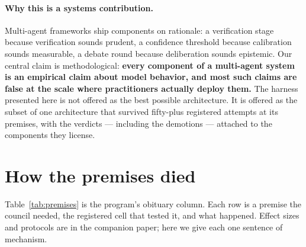 \documentclass[11pt]{article}
\begin{document}
\paragraph{Why this is a systems contribution.} Multi-agent frameworks
ship components on rationale: a verification stage because verification
sounds prudent, a confidence threshold because calibration sounds
measurable, a debate round because deliberation sounds epistemic. Our
central claim is methodological: \textbf{every component of a
multi-agent system is an empirical claim about model behavior, and most
such claims are false at the scale where practitioners actually deploy
them.} The harness presented here is not offered as the best possible
architecture. It is offered as the subset of one architecture that
survived fifty-plus registered attempts at its premises, with the
verdicts --- including the demotions --- attached to the components
they license.

\section{How the premises died}
\label{sec:premises}

Table~\ref{tab:premises} is the program's obituary column. Each row is
a premise the council needed, the registered cell that tested it, and
what happened. Effect sizes and protocols are in the companion paper;
here we give each one sentence of mechanism.
\end{document}
